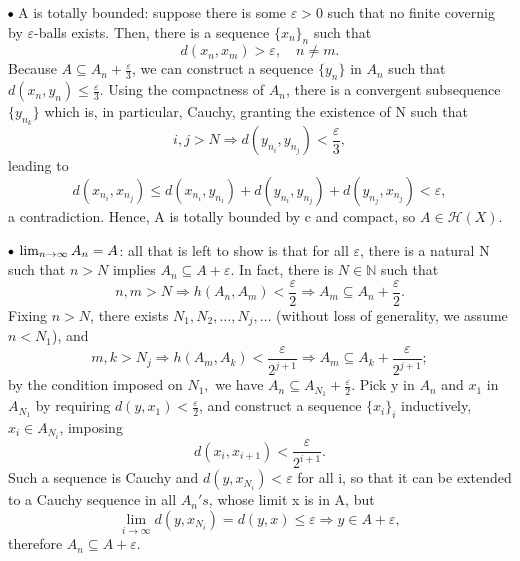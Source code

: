 \documentclass[../fractals_everywhere.tex]{subfiles}
\begin{document}
\begin{proof*}
	\(\tikz[baseline=-0.5ex]\draw[black, fill=black, radius=1.5pt](0, 0)circle;\;\)A is totally bounded: suppose there is some \(\varepsilon > 0\) such that no finite covernig by \(\varepsilon \)-balls exists. Then, there is a sequence \(\{x_{n}\}_{n}\) such that
	\[
		d(x_{n}, x_{m})> \varepsilon , \quad n\neq m.
	\]
	Because \(A\subseteq A_{n}+\frac{\varepsilon }{3}\), we can construct a sequence \(\{y_{n}\}\) in \(A_{n}\) such that \(d(x_{n}, y_{n}) \leq \frac{\varepsilon }{3}\). Using the compactness of \(A_{n}\), there is a convergent subsequence \(\{y_{n_{k}}\}\) which is, in particular, Cauchy, granting the existence of N such that
	\[
		i, j> N \Rightarrow d(y_{n_{i}}, y_{n_{j}})<\frac{\varepsilon }{3},
	\]
	leading to
	\[
		d(x_{n_{i}}, x_{n_{j}})\leq d(x_{n_{i}}, y_{n_{i}})+d(y_{n_{i}}, y_{n_{j}})+d(y_{n_{j}}, x_{n_{j}})<\varepsilon ,
	\]
	a contradiction. Hence, A is totally bounded by c and compact, so \(A\in \mathcal{H}(X)\).

	\(\tikz[baseline=-0.5ex]\draw[black, fill=black, radius=1.5pt](0, 0)circle;\; \lim_{n\to \infty}A_{n}=A\): all that is left to show is that for all \(\varepsilon \), there is a natural N such that \(n > N\) implies \(A_{n}\subseteq A+\varepsilon \). In fact, there is \(N\in \mathbb{N}\) such that
	\[
		n, m >N \Rightarrow h(A_{n}, A_{m}) < \frac{\varepsilon }{2} \Rightarrow A_{m}\subseteq A_{n}+\frac{\varepsilon }{2}.
	\]
	Fixing \(n> N\), there exists \(N_1, N_2, \dotsc , N_{j}, \dotsc \) (without loss of generality, we assume \(n<N_1\)), and
	\[
		m, k >N_{j} \Rightarrow h(A_{m}, A_{k})<\frac{\varepsilon }{2^{j+1}} \Rightarrow A_{m}\subseteq A_{k}+\frac{\varepsilon }{2^{j+1}};
	\]
	by the condition imposed on \(N_1,\) we have \(A_{n}\subseteq A_{N_1}+\frac{\varepsilon }{2}\). Pick y in \(A_{n}\) and \(x_1\) in \(A_{N_1}\) by requiring \(d(y, x_1)<\frac{\varepsilon }{2}\), and construct a sequence \(\{x_{i}\}_{i}\) inductively, \(x_{i}\in A_{N_{i}}\), imposing
	\[
		d(x_{i}, x_{i+1})<\frac{\varepsilon }{2^{i+1}}.
	\]
	Such a sequence is Cauchy and \(d(y, x_{N_{i}})<\varepsilon \) for all i, so that it can be extended to a Cauchy sequence in all \(A_{n}'s\), whose limit x is in A, but
	\[
		\lim_{i\to \infty}d(y, x_{N_{i}}) = d(y, x)\leq \varepsilon  \Rightarrow y\in A+\varepsilon,
	\]
	therefore \(A_{n}\subseteq A+\varepsilon \). \qedsymbol
\end{proof*}
\end{document}
